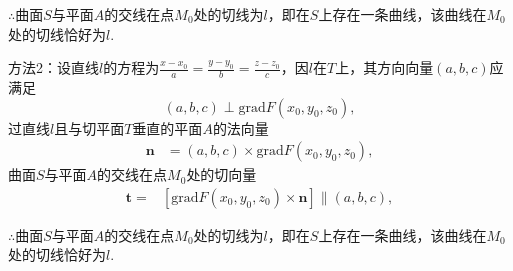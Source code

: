 \documentclass[12pt,UTF8]{ctexart}
\begin{document}
\begin{enumerate}
$\therefore$曲面$S$与平面$A$的交线在点$M_0$处的切线为$l$，即在$S$上存在一条曲线，该曲线在$M_0$处的切线恰好为$l$.

方法2：设直线$l$的方程为$\frac{x-x_0}a=\frac{y-y_0}b=\frac{z-z_0}c$，因$l$在$T$上，其方向向量$(a,b,c)$应满足
\[(a,b,c)\perp\mathrm{grad}F(x_0,y_0,z_0),\]
过直线$l$且与切平面$T$垂直的平面$A$的法向量
\[\begin{split}
\bm n&=(a,b,c)\times\mathrm{grad}F(x_0,y_0,z_0),
\end{split}\]
曲面$S$与平面$A$的交线在点$M_0$处的切向量
\[\begin{split}
\bm t=&[\mathrm{grad}F(x_0,y_0,z_0)\times\bm n]\parallel(a,b,c),
\end{split}\]

$\therefore$曲面$S$与平面$A$的交线在点$M_0$处的切线为$l$，即在$S$上存在一条曲线，该曲线在$M_0$处的切线恰好为$l$.
\end{enumerate}
\end{document}
